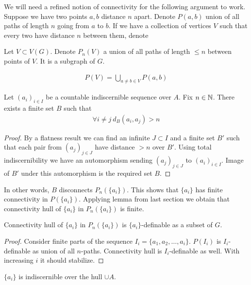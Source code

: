 \documentclass{amsart}
\begin{document}
We will need a refined notion of connectivity for the following argument to work. Suppose we have two points $a,b$ distance $n$ apart. Denote $P(a,b)$ union of all paths of length $n$ going from $a$ to $b$. If we have a collection of vertices $V$ such that every two have distance $n$ between them, denote

Let $V \subset V(G)$. Denote $P_n(V)$ a union of all paths of length $\leq n$ between points of $V$. It is a subgraph of $G$.

\begin{align*}
	P(V) = \bigcup_{a \neq b \in V} P(a,b)
\end{align*}

\begin{Lemma}
	Let $(a_i)_{i \in I}$ be a countable indiscernible sequence over $A$. Fix $n \in \mathbb{N}$. There exists a finite set $B$ such that
	\begin{align*}
		\forall i \neq j \ d_B(a_i, a_j) > n
	\end{align*}
\end{Lemma}

\begin{proof}
	By a flatness result we can find an infinite $J \subset I$ and a finite set $B'$ such that each pair from $(a_j)_{j \in J}$ have distance $>n$ over $B'$. Using total indiscernibility we have an automorphism sending $(a_j)_{j \in J}$ to $(a_i)_{i \in I}$. Image of $B'$ under this automorphism is the required set $B$.
\end{proof}

In other words, $B$ disconnects $P_n(\{a_i\})$. This shows that $\{a_i\}$ has finite connectivity in $P(\{a_i\})$. Applying lemma from last section we obtain that connectivity hull of $\{a_i\}$ in $P_n(\{a_i\})$ is finite.

\begin{Lemma}
	Connectivity hull of $\{a_i\}$ in $P_n(\{a_i\})$ is $\{a_i\}$-definable as a subset of $G$.
\end{Lemma}

\begin{proof}
	Consider finite parts of the sequence $I_i = \{a_1, a_2, \ldots, a_i\}$. $P(I_i)$ is $I_i$-definable as union of all $n$-paths. Connectivity hull is $I_i$-definable as well. With increasing $i$ it should stabilize.
\end{proof}

\begin{Lemma}
	$\{a_i\}$ is indiscernible over the hull $\cup A$.
\end{Lemma}
\end{document}
